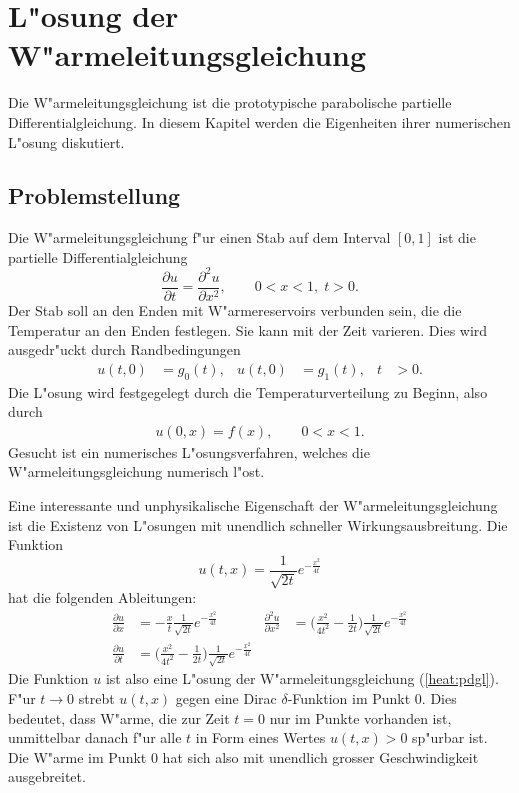 \chapter{L"osung der W"armeleitungsgleichung}


{\parindent0pt
Die W"armeleitungsgleichung ist die prototypische parabolische
partielle Differentialgleichung.
In diesem Kapitel werden die Eigenheiten ihrer numerischen L"osung
diskutiert.}

\section{Problemstellung}
Die W"armeleitungsgleichung f"ur einen Stab
auf dem Interval $[0,1]$ ist die partielle Differentialgleichung
\begin{equation}
\frac{\partial u}{\partial t}=\frac{\partial^2 u}{\partial x^2}, \qquad
0<x<1,\;t>0.
\label{heat:pdgl}
\end{equation}
Der Stab soll an den Enden mit W"armereservoirs verbunden sein, die
die Temperatur an den Enden festlegen. Sie kann mit der Zeit varieren.
Dies wird ausgedr"uckt durch
Randbedingungen
\begin{align}
u(t,0)&=g_0(t),
&
u(t,0)&=g_1(t),&t&>0.
\label{heat:rand}
\end{align}
Die L"osung wird festgegelegt durch die Temperaturverteilung zu Beginn,
also durch
\begin{align}
u(0,x)=f(x),\qquad 0<x<1.
\end{align}
Gesucht ist ein numerisches L"osungsverfahren, welches die
W"armeleitungsgleichung numerisch l"ost.

Eine interessante und unphysikalische Eigenschaft der W"armeleitungsgleichung
ist die Existenz von L"osungen mit unendlich schneller Wirkungsausbreitung.
Die Funktion
\begin{equation}
u(t,x)=\frac1{\sqrt{2t}}e^{-\frac{x^2}{4t}}
\label{heat:solution}
\end{equation}
hat die folgenden Ableitungen:
\begin{align*}
\frac{\partial u}{\partial x}&=
-
\frac{x}{t}
\frac1{\sqrt{2t}}
e^{-\frac{x^2}{4t}}
&
\frac{\partial^2 u}{\partial x^2}&=
\biggl(\frac{x^2}{4t^2}-\frac1{2t}\biggr)
\frac1{\sqrt{2t}}
e^{-\frac{x^2}{4t}}
\\
\frac{\partial u}{\partial t}&=
\biggl(\frac{x^2}{4t^2}-\frac1{2t}\biggr)
\frac1{\sqrt{2t}}
e^{-\frac{x^2}{4t}}
\end{align*}
Die Funktion $u$ ist also eine L"osung der W"armeleitungsgleichung
(\ref{heat:pdgl}).
F"ur $t\to 0$ strebt $u(t,x)$ gegen eine Dirac $\delta$-Funktion
im Punkt 0.
Dies bedeutet, dass W"arme, die zur Zeit $t=0$ nur im Punkte vorhanden
ist, unmittelbar danach f"ur alle $t$ in Form eines Wertes $u(t,x) > 0$
sp"urbar ist.
Die W"arme im Punkt $0$ hat sich also mit unendlich grosser Geschwindigkeit
ausgebreitet.

